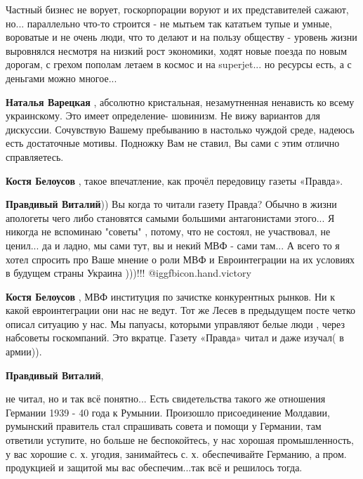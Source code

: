 \begin{itemize}
\begin{itemize}
Частный бизнес не ворует, госкорпорации воруют и их представителей сажают,
но... параллельно что-то строится - не мытьем так кататьем тупые и умные,
вороватые и не очень люди, что то делают и на пользу обществу - уровень жизни
выровнялся несмотря на низкий рост экономики, ходят новые поезда по новым
дорогам, с грехом пополам летаем в космос и на superjet... но ресурсы есть, а с
деньгами можно многое...

\textbf{Наталья Варецкая} , абсолютно кристальная, незамутненная ненависть ко всему украинскому.
Это имеет определение- шовинизм.
Не вижу вариантов для дискуссии.
Сочувствую Вашему пребыванию в настолько чуждой среде, надеюсь есть достаточные мотивы.
Подножку Вам не ставил, Вы сами с этим отлично справляетесь.

\textbf{Костя Белоусов} , такое впечатление, как прочёл передовицу газеты «Правда».

\textbf{Правдивый Виталий}))
Вы когда то читали газету Правда?
Обычно в жизни апологеты чего либо становятся самыми большими антагонистами этого...
Я никогда не вспоминаю "советы" , потому, что не состоял, не участвовал, не ценил... да и ладно, мы сами тут, вы и некий МВФ - сами там...
А всего то я хотел спросить про Ваше мнение о роли МВФ и Евроинтеграции на их условиях в будущем страны Украина )))!!! 
@igg{fbicon.hand.victory}

\textbf{Костя Белоусов} , МВФ институция по зачистке конкурентных рынков.
Ни к какой евроинтеграции они нас не ведут.
Тот же Лесев в предыдущем посте четко описал ситуацию у нас.
Мы папуасы, которыми управляют белые люди , через набсоветы госкомпаний.
Это вкратце.
Газету «Правда» читал и даже изучал( в армии)).

\textbf{Правдивый Виталий}, 

не читал, но и так всё понятно...
Есть свидетельства такого же отношения Германии 1939 - 40 года к Румынии.
Произошло присоединение Молдавии, румынский правитель стал спрашивать совета и помощи у Германии, там ответили уступите, но больше не беспокойтесь, у нас хорошая промышленность, у вас хорошие с. х. угодия, занимайтесь с. х. обеспечивайте Германию, а пром. продукцией и защитой мы вас обеспечим...так всё и решилось тогда.

\end{itemize} %



\end{itemize}
